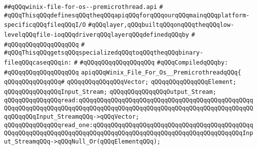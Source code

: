 \label{src/lib/std/src/io/winix-file-for-os--premicrothread.api}
\verb|##qQQqwinix-file-for-os--premicrothread.api|\newline
\verb|#|\newline
\verb|#qQQqThisqQQqdefinesqQQqtheqQQqapiqQQqforqQQqourqQQqmainqQQqplatform-specificqQQqfileqQQqI/O|\newline
\verb|#qQQqlayer,qQQqbuiltqQQqonqQQqtheqQQqlow-levelqQQqfile-ioqQQqdriverqQQqlayerqQQqdefinedqQQqby|\newline
\verb|#|\newline
\verb|#qQQqqQQqqQQqqQQqqQQq|\newline
\verb|#|\newline
\verb|#qQQqThisqQQqgetsqQQqspecializedqQQqtoqQQqtheqQQqbinary-fileqQQqcaseqQQqin:|\newline
\verb|#|\newline
\verb|#qQQqqQQqqQQqqQQqqQQq|\newline
\newline
\verb|#qQQqCompiledqQQqby:|\newline
\verb|#qQQqqQQqqQQqqQQqqQQq|\newline
\newline
\newline
\verb|apiqQQqWinix_File_For_Os__PremicrothreadqQQq{|\newline
\verb|qQQqqQQqqQQqqQQq#|\newline
\verb|qQQqqQQqqQQqqQQqVector;|\newline
\verb|qQQqqQQqqQQqqQQqElement;|\newline
\newline
\verb|qQQqqQQqqQQqqQQqInput_Stream;|\newline
\verb|qQQqqQQqqQQqqQQqOutput_Stream;|\newline
\newline
\verb|qQQqqQQqqQQqqQQqread:qQQqqQQqqQQqqQQqqQQqqQQqqQQqqQQqqQQqqQQqqQQqqQQqqQQqqQQqqQQqqQQqqQQqqQQqqQQqqQQqqQQqqQQqqQQqqQQqqQQqqQQqqQQqqQQqqQQqqQQqqQQqqQQqInput_StreamqQQq->qQQqVector;|\newline
\verb|qQQqqQQqqQQqqQQqread_one:qQQqqQQqqQQqqQQqqQQqqQQqqQQqqQQqqQQqqQQqqQQqqQQqqQQqqQQqqQQqqQQqqQQqqQQqqQQqqQQqqQQqqQQqqQQqqQQqqQQqqQQqqQQqqQQqInput_StreamqQQq->qQQqNull_Or(qQQqElementqQQq);|\newline
